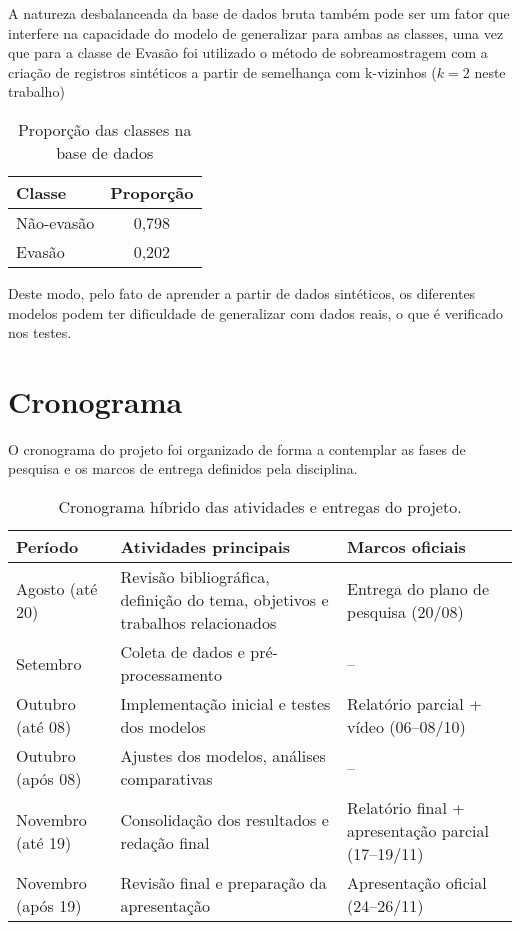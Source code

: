 \documentclass[english, spanish, brazilian]{RBIEarticle} %
\begin{document}
A natureza desbalanceada da base de dados bruta também pode ser um fator que interfere na capacidade do modelo de generalizar para ambas as classes, uma vez que para a classe de Evasão foi utilizado o método de sobreamostragem com a criação de registros sintéticos a partir de semelhança com k-vizinhos ($k=2$ neste trabalho)

\vspace{0.5cm}
\begin{table}[htbp]
\centering
\label{tab:proporcao}
\begin{tabular}{lc}
\hline
Classe & Proporção \\ \hline
Não-evasão  & 0,798 \\ 
Evasão      & 0,202 \\ \hline
\end{tabular}
\caption{Proporção das classes na base de dados}
\end{table}
\vspace{0.5cm}

Deste modo, pelo fato de aprender a partir de dados sintéticos, os diferentes modelos podem ter dificuldade de generalizar com dados reais, o que é verificado nos testes.


\pagebreak
\section{Cronograma}
O cronograma do projeto foi organizado de forma a contemplar as fases de pesquisa e os marcos de entrega definidos pela disciplina.
\begin{table}[h]
\centering
\begin{tabular}{p{3cm} p{7cm} p{5cm}}
\hline
\textbf{Período} & \textbf{Atividades principais} & \textbf{Marcos oficiais} \\
\hline
Agosto (até 20) & Revisão bibliográfica, definição do tema, objetivos e trabalhos relacionados & Entrega do plano de pesquisa (20/08) \\
Setembro        & Coleta de dados e pré-processamento & -- \\
Outubro (até 08) & Implementação inicial e testes dos modelos & Relatório parcial + vídeo (06--08/10) \\
Outubro (após 08) & Ajustes dos modelos, análises comparativas & -- \\
Novembro (até 19) & Consolidação dos resultados e redação final & Relatório final + apresentação parcial (17--19/11) \\
Novembro (após 19) & Revisão final e preparação da apresentação & Apresentação oficial (24--26/11) \\
\hline
\end{tabular}
\caption{Cronograma híbrido das atividades e entregas do projeto.}
\label{tab:cronograma}
\end{table}





\pagebreak
\nocite{*}
\printbibliography
\end{document}
